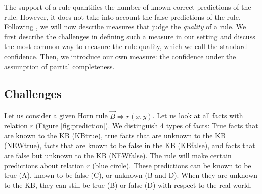 
\label{sec:experimentsPCA}





The support of a rule quantifies the number of known correct predictions of the rule.
However, it does not take into account the false predictions of the rule.
Following \cite{amie}, we will now describe measures that judge the \emph{quality} of a rule.
We first describe the challenges in defining such a measure in our setting
and discuss the most common way to measure the rule quality, which we call the standard confidence.
Then, we introduce our own measure: the confidence under the assumption of partial completeness.




\subsection{Challenges}
Let us consider a given Horn rule $\vec{B} \Rightarrow r(x,y)$. Let us look at all facts with relation $r$ (Figure \ref{fig:prediction}).
We distinguish 4 types of facts: True facts that are known to the KB (KBtrue), true facts that are unknown to the KB (NEWtrue),
facts that are known to be false in the KB (KBfalse), and facts that are false but unknown to the KB (NEWfalse).
The rule will make certain predictions about relation $r$ (blue circle). These predictions can be known to be true (A), known to be false (C), or unknown (B and D).
When they are unknown to the KB, they can still be true (B) or false (D) with respect to the real world.\\

